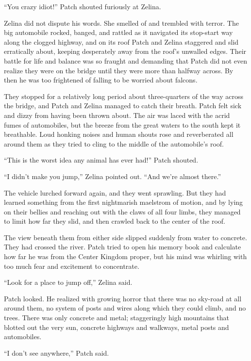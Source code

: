 \documentclass[ebook,oneside,openany,17pt]{memoir}
\begin{document}
“You crazy idiot!” Patch shouted furiously at Zelina.

Zelina did not dispute his words. She smelled of and trembled with
terror. The big automobile rocked, banged, and rattled as it navigated
its stop-start way along the clogged highway, and on its roof Patch
and Zelina staggered and slid erratically about, keeping desperately
away from the roof’s unwalled edges. Their battle for life and balance
was so fraught and demanding that Patch did not even realize they were
on the bridge until they were more than halfway across. By then he was
too frightened of falling to be worried about falcons.

They stopped for a relatively long period about three-quarters of the
way across the bridge, and Patch and Zelina managed to catch their
breath. Patch felt sick and dizzy from having been thrown about. The
air was laced with the acrid fumes of automobiles, but the breeze from
the great waters to the south kept it breathable. Loud honking noises
and human shouts rose and reverberated all around them as they tried
to cling to the middle of the automobile’s roof.

“This is the worst idea any animal has ever had!” Patch shouted.

“I didn’t make you jump,” Zelina pointed out. “And we’re almost
there.”

The vehicle lurched forward again, and they went sprawling. But they
had learned something from the first nightmarish maelstrom of motion,
and by lying on their bellies and reaching out with the claws of all
four limbs, they managed to limit how far they slid, and then crawled
back to the center of the roof.

The view beneath them from either side slipped suddenly from water to
concrete. They had crossed the river. Patch tried to open his memory
book and calculate how far he was from the Center Kingdom proper, but
his mind was whirling with too much fear and excitement to
concentrate.

“Look for a place to jump off,” Zelina said.

Patch looked. He realized with growing horror that there was no
sky-road at all around them, no system of posts and wires along which
they could climb, and no trees. There was only concrete and metal;
staggeringly high mountains that blotted out the very sun, concrete
highways and walkways, metal posts and automobiles.

“I don’t see anywhere,” Patch said.
\end{document}
